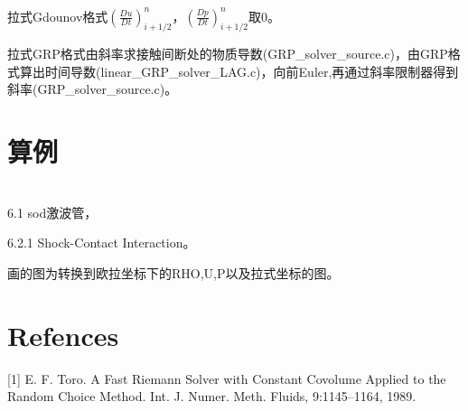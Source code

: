 \documentclass{article}
\begin{document}
拉式Gdounov格式$(\frac{D u}{D t})_{i+1/2}^{n}，(\frac{D p}{D t})_{i+1/2}^{n}$取0。

拉式GRP格式由斜率求接触间断处的物质导数(GRP\_solver\_source.c)，由GRP格式算出时间导数(linear\_GRP\_solver\_LAG.c)，向前Euler,再通过斜率限制器得到斜率(GRP\_solver\_source.c)。

\section{算例}
\ \\

6.1 sod激波管，

6.2.1 Shock-Contact Interaction。

画的图为转换到欧拉坐标下的RHO,U,P以及拉式坐标的图。


\section*{Refences}
[1] E. F. Toro. A Fast Riemann Solver with Constant Covolume Applied to the
Random Choice Method. Int. J. Numer. Meth. Fluids, 9:1145–1164, 1989.
\end{document}
